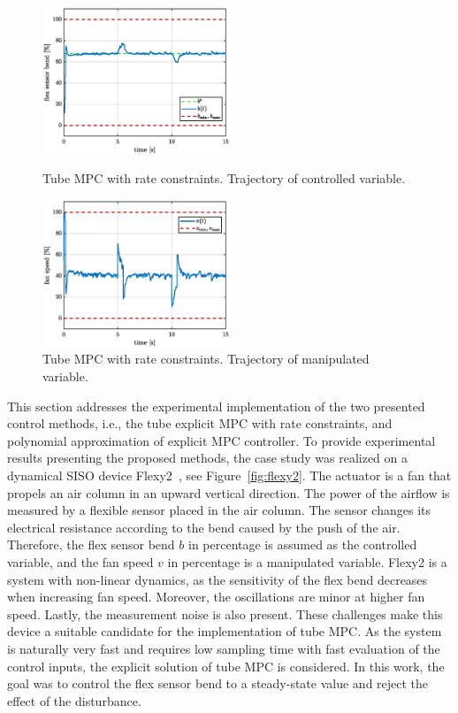\documentclass[letterpaper, 10 pt, conference]{ieeeconf}
\begin{document}
\begin{figure}[hbp!]
	\begin{center}
		\includegraphics[width=0.5\textwidth]{images/deltaU_b_new.eps}
		\caption{Tube MPC with rate constraints. Trajectory of controlled variable.}
		\label{fig:deltaU_y}
	\end{center}
	\begin{center}
		\includegraphics[width=0.5\textwidth]{images/deltaU_v_new.eps}
		\caption{Tube MPC with rate constraints. Trajectory of manipulated variable.}
		\label{fig:deltaU_u}
	\end{center}
\end{figure}

This section addresses the experimental implementation of the two presented control methods, i.e., the tube explicit MPC with rate constraints, and polynomial approximation of explicit MPC controller. To provide experimental results presenting the proposed methods, the case study was realized on a dynamical SISO device Flexy2~\cite{flexy2}, see Figure~\ref{fig:flexy2}. The actuator is a fan that propels an air column in an upward vertical direction. The power of the airflow is measured
by a flexible sensor placed in the air column. The sensor changes its electrical resistance according to the bend caused by the push of the air. Therefore, the flex sensor bend $b$ in percentage is assumed as the controlled variable, and the fan speed $v$ in percentage is a manipulated variable. Flexy2 is a system with non-linear dynamics, as the sensitivity of the flex bend decreases when increasing fan speed. Moreover, the oscillations are minor at higher fan speed. Lastly, the measurement noise is also present. These challenges make this device a suitable candidate for the implementation of tube MPC. As the system is naturally very fast and requires low sampling time with fast evaluation of the control inputs, the explicit solution of tube MPC is considered. In this work, the goal was to control the flex sensor bend to a steady-state value and reject the effect of the disturbance.
\end{document}
